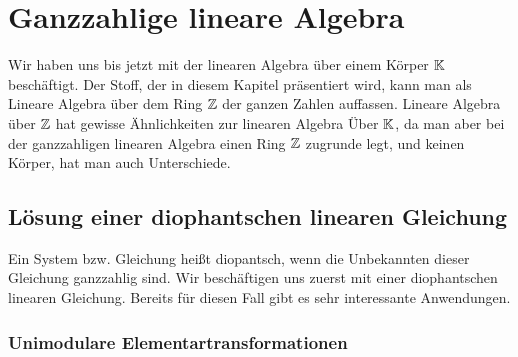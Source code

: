 	\section{Ganzzahlige lineare Algebra} 
	
	Wir haben uns bis jetzt mit der linearen Algebra über einem Körper $\mathbb K$ beschäftigt. Der Stoff, der in diesem Kapitel präsentiert wird, kann man als Lineare Algebra über dem Ring $\mathbb Z$ der ganzen Zahlen auffassen. Lineare Algebra über $\mathbb Z$ hat gewisse Ähnlichkeiten zur linearen Algebra Über $\mathbb K$, da man aber  bei der ganzzahligen linearen Algebra einen Ring $\mathbb Z$ zugrunde legt, und keinen Körper, hat man auch Unterschiede.
	
	\subsection{Lösung einer diophantschen linearen Gleichung} 
	
	Ein System bzw. Gleichung heißt diopantsch, wenn die Unbekannten dieser Gleichung ganzzahlig sind. Wir beschäftigen uns zuerst mit einer diophantschen linearen Gleichung. Bereits für diesen Fall gibt es sehr interessante Anwendungen. 
	
	\subsubsection{Unimodulare  Elementartransformationen}
	
